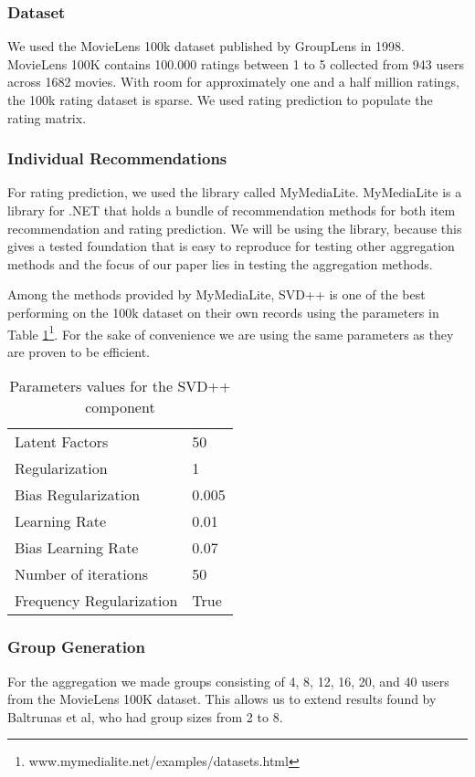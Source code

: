 \subsubsection{Dataset}\label{sec:dataset}
We used the MovieLens 100k dataset published by GroupLens in 1998\cite{movielens100k}. MovieLens 100K contains 100.000 ratings between 1 to 5 collected from 943 users across 1682 movies. With room for approximately one and a half million ratings, the 100k rating dataset is sparse. We used rating prediction to populate the rating matrix.

\subsubsection{Individual Recommendations}\label{sec:individualrecommendation}
For rating prediction, we used the library called MyMediaLite\cite{mymedialite}. MyMediaLite is a library for .NET that holds a bundle of recommendation methods for both item recommendation and rating prediction. We will be using the library, because this gives a tested foundation that is easy to reproduce for testing other aggregation methods and the focus of our paper lies in testing the aggregation methods.

Among the methods provided by MyMediaLite, SVD++ is one of the best performing on the 100k dataset on their own records using the parameters in Table \ref{tbl:svdpp}\footnote{www.mymedialite.net/examples/datasets.html}. For the sake of convenience we are using the same parameters as they are proven to be efficient.

\begin{table}[H]
	\centering
	\begin{tabular}{|l|l|}\hline
		Latent Factors & 50 \\
		Regularization & 1	\\
		Bias Regularization & 0.005	\\
		Learning Rate & 0.01 \\
		Bias Learning Rate & 0.07 \\ 
		Number of iterations & 50 \\
		Frequency Regularization & True \\\hline
	\end{tabular}
	\caption{Parameters values for the SVD++ component}
	\label{tbl:svdpp}
\end{table}

\subsubsection{Group Generation}\label{sec:groupgeneration}
For the aggregation we made groups consisting of 4, 8, 12, 16, 20, and 40 users from the MovieLens 100K dataset. This allows us to extend results found by Baltrunas et al\cite{Baltrunas:2010:GRR:1864708.1864733}, who had group sizes from 2 to 8.

